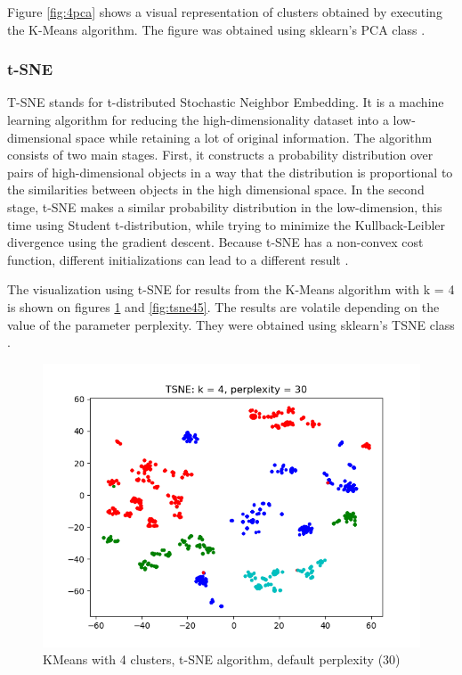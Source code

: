 \documentclass[times, utf8, zavrsni, numeric]{fer}
\begin{document}
Figure \ref{fig:4pca} shows a visual representation of clusters 
obtained by executing the K-Means algorithm. The figure was obtained
using sklearn's PCA class \cite{pcaSklearn}.

\subsubsection{t-SNE}
T-SNE stands for t-distributed Stochastic Neighbor Embedding. It is a machine learning
algorithm for reducing the high-dimensionality dataset into a low-dimensional space while 
retaining a lot of original information. The algorithm consists of two main 
stages. First, it constructs a probability distribution over pairs of high-dimensional 
objects in a way that the distribution is proportional to the similarities between objects
in the high dimensional space. In the second stage, t-SNE makes a similar
probability distribution in the low-dimension, this time using Student t-distribution, 
while trying to minimize the Kullback-Leibler divergence using the gradient descent. 
Because t-SNE has a non-convex cost function, different initializations can lead to a different result \cite{tsne}.

The visualization using t-SNE for results from the K-Means algorithm with k = 4 is shown on 
figures \ref{fig:tsne30} and \ref{fig:tsne45}. The results are volatile depending on the 
value of the parameter perplexity. They were obtained using sklearn's TSNE class \cite{tsneSklearn}.

\begin{figure}[H]
    \centering
    \includegraphics[width=\linewidth]{figures/tsne}
    \caption{KMeans with 4 clusters, t-SNE algorithm, default perplexity (30)}
    \label{fig:tsne30}
\end{figure}
\end{document}
